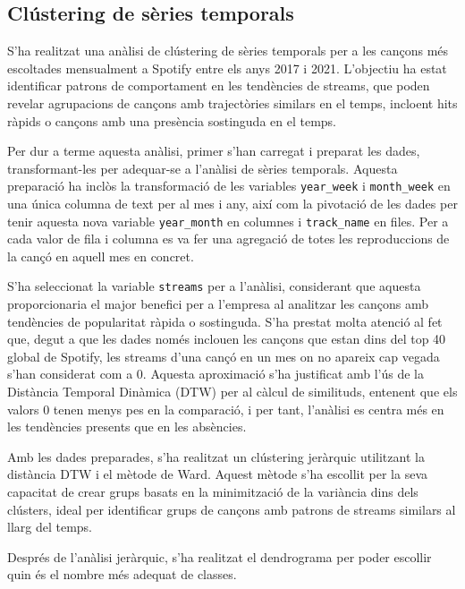 \subsection{Clústering de sèries temporals}

S'ha realitzat una anàlisi de clústering de sèries temporals per a les cançons més escoltades mensualment a Spotify entre els anys 2017 i 2021. L'objectiu ha estat identificar patrons de comportament en les tendències de streams, que poden revelar agrupacions de cançons amb trajectòries similars en el temps, incloent hits ràpids o cançons amb una presència sostinguda en el temps.

Per dur a terme aquesta anàlisi, primer s'han carregat i preparat les dades, transformant-les per adequar-se a l'anàlisi de sèries temporals. Aquesta preparació ha inclòs la transformació de les variables \texttt{year\_week} i \texttt{month\_week} en una única columna de text per al mes i any, així com la pivotació de les dades per tenir aquesta nova variable \texttt{year\_month} en columnes i \texttt{track\_name} en files. Per a cada valor de fila i columna es va fer una agregació de totes les reproduccions de la cançó en aquell mes en concret.

S'ha seleccionat la variable \texttt{streams} per a l'anàlisi, considerant que aquesta proporcionaria el major benefici per a l'empresa al analitzar les cançons amb tendències de popularitat ràpida o sostinguda. S'ha prestat molta atenció al fet que, degut a que les dades només inclouen les cançons que estan dins del top 40 global de Spotify, les streams d'una cançó en un mes on no apareix cap vegada s'han considerat com a 0. Aquesta aproximació s'ha justificat amb l'ús de la Distància Temporal Dinàmica (DTW) per al càlcul de similituds, entenent que els valors 0 tenen menys pes en la comparació, i per tant, l'anàlisi es centra més en les tendències presents que en les absències.

Amb les dades preparades, s'ha realitzat un clústering jeràrquic utilitzant la distància DTW i el mètode de Ward. Aquest mètode s'ha escollit per la seva capacitat de crear grups basats en la minimització de la variància dins dels clústers, ideal per identificar grups de cançons amb patrons de streams similars al llarg del temps. 

Després de l'anàlisi jeràrquic, s'ha realitzat el dendrograma per poder escollir quin és el nombre més adequat de classes.

